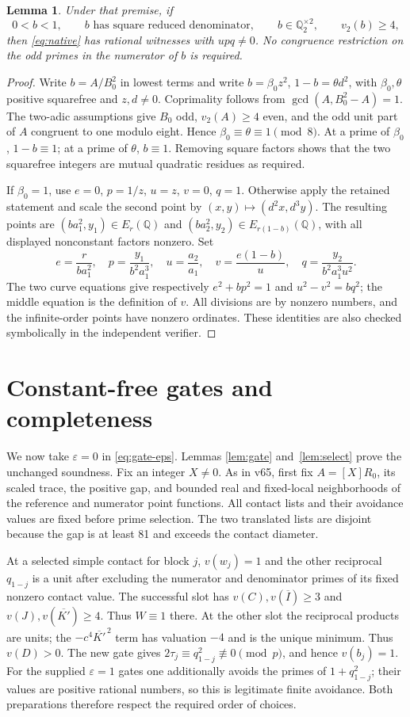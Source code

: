 \documentclass[11pt,a4paper]{article}
\newtheorem{lemma}[theorem]{Lemma}
\newcommand{\Q}{\mathbb Q}\newcommand{\Z}{\mathbb Z}
\begin{document}
\begin{lemma}\label{lem:small}
Under that premise, if
\[
 0<b<1,\qquad b\text{ has square reduced denominator},\qquad
 b\in\Q_2^{\times2},\qquad v_2(b)\ge4,
\]
then \eqref{eq:native} has rational witnesses with $upq\ne0$.
No congruence restriction on the odd primes in the numerator of $b$
is required.
\end{lemma}
\begin{proof}
Write $b=A/B_0^2$ in lowest terms and write
$b=\beta_0z^2$, $1-b=\theta d^2$, with $\beta_0,\theta$ positive
squarefree and $z,d\ne0$. Coprimality follows from
$\gcd(A,B_0^2-A)=1$. The two-adic assumptions give $B_0$ odd,
$v_2(A)\ge4$ even, and the odd unit part of $A$ congruent to one
modulo eight. Hence $\beta_0\equiv\theta\equiv1\pmod8$.
At a prime of $\beta_0$, $1-b\equiv1$; at a prime of $\theta$,
$b\equiv1$. Removing square factors shows that the two squarefree
integers are mutual quadratic residues as required.

If $\beta_0=1$, use $e=0$, $p=1/z$, $u=z$, $v=0$, $q=1$.
Otherwise apply the retained statement and scale the second point by
$(x,y)\mapsto(d^2x,d^3y)$. The resulting points are
$(ba_1^2,y_1)\in E_r(\Q)$ and
$(ba_2^2,y_2)\in E_{r(1-b)}(\Q)$, with all displayed nonconstant
factors nonzero. Set
\[
 e=\frac r{ba_1^2},\quad p=\frac{y_1}{b^2a_1^3},\quad
 u=\frac{a_2}{a_1},\quad v=\frac{e(1-b)}u,\quad
 q=\frac{y_2}{b^2a_1^3u^2}.
\]
The two curve equations give respectively $e^2+bp^2=1$ and
$u^2-v^2=bq^2$; the middle equation is the definition of $v$.
All divisions are by nonzero numbers, and the infinite-order points
have nonzero ordinates. These identities are also checked symbolically
in the independent verifier.
\end{proof}

\section{Constant-free gates and completeness}
We now take $\varepsilon=0$ in \eqref{eq:gate-eps}. Lemmas
\ref{lem:gate} and~\ref{lem:select} prove the unchanged soundness.
Fix an integer $X\ne0$. As in v65, first fix $A=[X]R_0$,
its scaled trace, the positive gap, and bounded real and fixed-local
neighborhoods of the reference and numerator point functions.
All contact lists and their avoidance values are fixed before prime
selection. The two translated lists are disjoint because the gap is
at least 81 and exceeds the contact diameter.

At a selected simple contact for block $j$, $v(w_j)=1$ and the other
reciprocal $q_{1-j}$ is a unit after excluding the numerator and
denominator primes of its fixed nonzero contact value. The successful
slot has $v(C),v(\overline I)\ge3$ and $v(J),v(\overline {K'})\ge4$.
Thus $W\equiv1$ there. At the other slot the reciprocal products are
units; the $-c^4\overline {K'}^{\,2}$ term has valuation $-4$ and
is the unique minimum. Thus $v(D)>0$. The new gate gives
$2\tau_j\equiv q_{1-j}^2\not\equiv0\pmod p$, and hence
$v(b_j)=1$. For the supplied $\varepsilon=1$ gates one additionally
avoids the primes of $1+q_{1-j}^2$; their values are positive rational
numbers, so this is legitimate finite avoidance. Both preparations
therefore respect the required order of choices.
\end{document}

